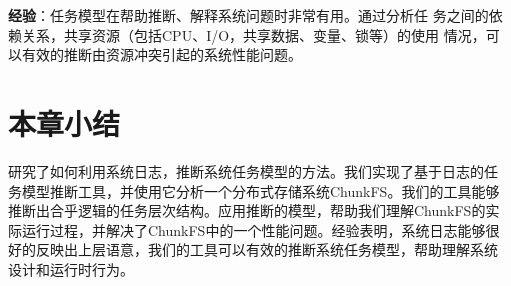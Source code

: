 \textbf{经验}：任务模型在帮助推断、解释系统问题时非常有用。通过分析任
务之间的依赖关系，共享资源（包括CPU、I/O，共享数据、变量、锁等）的使用
情况，可以有效的推断由资源冲突引起的系统性能问题。

\section{本章小结}
\label{lm_conclusion}

研究了如何利用系统日志，推断系统任务模型的方法。我们实现了基于日志的任
务模型推断工具，并使用它分析一个分布式存储系统ChunkFS。我们的工具能够
推断出合乎逻辑的任务层次结构。应用推断的模型，帮助我们理解ChunkFS的实
际运行过程，并解决了ChunkFS中的一个性能问题。经验表明，系统日志能够很
好的反映出上层语意，我们的工具可以有效的推断系统任务模型，帮助理解系统
设计和运行时行为。
